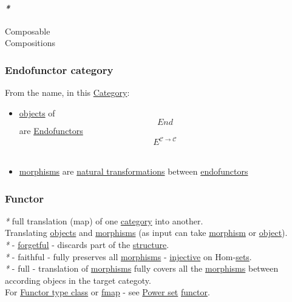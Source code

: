 \documentclass[11pt]{article}
\begin{document}
\paragraph{\emph{*}}
\label{sec:org78c4f78}

\label{org99d574f}Composable\\
\label{org89b4de0}Compositions\\

\subsubsection{\label{org1ac5851}Endofunctor category}
\label{sec:org6d65f50}
From the name, in this \hyperref[org0450535]{Category}:\\
\begin{itemize}
\item \hyperref[org363acc2]{objects} of $$ End $$ are \hyperref[orgfcca64a]{Endofunctors} $$ E^{\mathcal{C \to C}} $$\\
\item \hyperref[org6c2fa5c]{morphisms} are \hyperref[org5148d4c]{natural transformations} between \hyperref[orgfcca64a]{endofunctors}\\
\end{itemize}

\subsubsection{\label{orgf2f6841}Functor}
\label{sec:org0198da8}
\emph{*} full translation (map) of one \hyperref[org0450535]{category} into another.\\
Translating \hyperref[org363acc2]{objects} and \hyperref[org6c2fa5c]{morphisms} (as input can take \hyperref[org5de09d4]{morphism} or \hyperref[org4be0e9d]{object}).\\

\emph{*} - \hyperref[org8231345]{forgetful} - discards part of the \hyperref[org8051f61]{structure}.\\
\emph{*} - faithful - fully preserves all \hyperref[org6c2fa5c]{morphisms} - \hyperref[org51366e0]{injective} on Hom-\hyperref[org58ec608]{sets}.\\
\emph{*} - full - translation of \hyperref[org6c2fa5c]{morphisms} fully covers all the \hyperref[org6c2fa5c]{morphisms} between according objecs in the target categoty.\\

For \hyperref[org67c1dcb]{Functor type class} or \hyperref[org293a48f]{fmap} - see \hyperref[org8dd7cb1]{Power set} \hyperref[orgf2f6841]{functor}.\\
\end{document}

